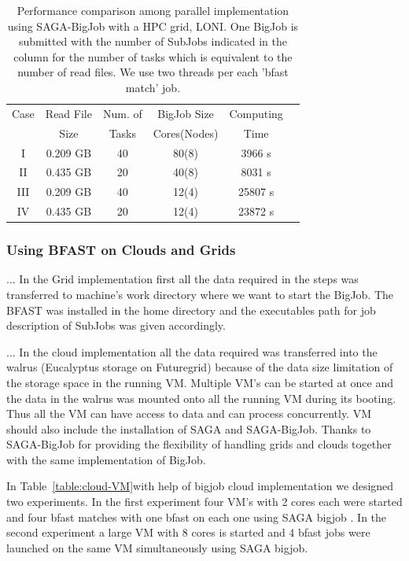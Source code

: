 \documentclass{acm_proc_article-sp}
\begin{document}
 \begin{table}


 \begin{tabular}{|c|c|c|c|c|c |} 
 \hline 
 
Case & Read File  &  Num. of & BigJob Size   &  Computing  \\
   & Size & Tasks  & Cores(Nodes)  & Time \\
   \hline
I & 0.209 GB  &   40 &  80(8) & 3966 s \\
II & 0.435 GB    &  20 & 40(8) & 8031 s\\
III  & 0.209 GB & 40  & 12(4) & 25807 s \\
IV  & 0.435 GB & 20  & 12(4) & 23872 s  \\
\hline
\end{tabular}
\caption{Performance comparison among parallel implementation using
  SAGA-BigJob with a HPC grid, LONI. One BigJob is submitted with the
  number of SubJobs indicated in the column for the number of tasks
  which is equivalent to the number of read files. We use two threads
  per each 'bfast   match' job.}
  \label{table:bigjob-loni} 
\end{table}


\subsubsection{Using BFAST on Clouds and Grids}

...  In the Grid implementation first all the
data required in the steps was transferred to machine's work directory
where we want to start the BigJob. The BFAST was installed in the home
directory and the executables path for job description of SubJobs was
given accordingly.

...  In the cloud implementation all the data
required was transferred into the walrus (Eucalyptus storage on Futuregrid) because of the data size
limitation of the storage space in the running VM. Multiple VM's can
be started at once and the data in the walrus was mounted onto all the
running VM during its booting. Thus all the VM can have
access to data and can process concurrently. VM should also include the installation of
SAGA and SAGA-BigJob. Thanks to SAGA-BigJob for providing the flexibility of 
handling grids and clouds together with the same implementation of BigJob.

In Table~\ref{table:cloud-VM}with help of bigjob cloud implementation we designed two
experiments. In the first experiment four VM's with 2 cores each were
started and four bfast matches with one bfast on each one using SAGA
bigjob . In the second experiment a large VM with 8 cores is started
and 4 bfast jobs were launched on the same VM simultaneously using
SAGA bigjob.
\end{document}
